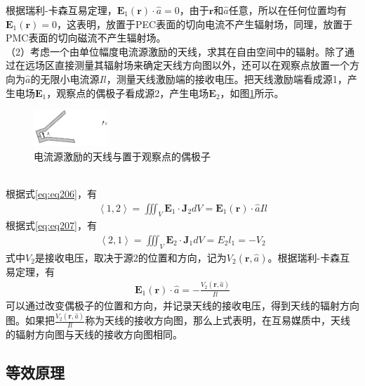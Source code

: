 \documentclass{article}
\numberwithin{equation}{section}
\renewcommand{\vec}[1]{\boldsymbol{#1}}
\begin{document}
根据瑞利-卡森互易定理，$\mathbf{E}_1(\vec{r})\cdot\hat{a}=0$，由于$\vec{r}$和$\hat{a}$任意，所以在任何位置均有$\mathbf{E}_1(\vec{r})=0$，这表明，放置于PEC表面的切向电流不产生辐射场，同理，放置于PMC表面的切向磁流不产生辐射场。\\
（2）考虑一个由单位幅度电流源激励的天线，求其在自由空间中的辐射。除了通过在远场区直接测量其辐射场来确定天线方向图以外，还可以在观察点放置一个方向为$\hat{a}$的无限小电流源$Il$，测量天线激励端的接收电压。把天线激励端看成源1，产生电场$\mathbf{E}_1$，观察点的偶极子看成源2，产生电场$\mathbf{E}_2$，如图\ref{fig:fig13}所示。
\begin{figure}[ht]
    \centering
    \includegraphics[width=0.25\textwidth]{电流源激励的天线与置于观察点的偶极子.PNG}
    \caption{电流源激励的天线与置于观察点的偶极子}
    \label{fig:fig13}
\end{figure}
\\根据式\ref{eq:eq206}，有
\begin{align}
    \label{eq:eq211}
    \left\langle 1,2\right\rangle =\iiint_V\mathbf{E}_1\cdot\mathbf{J}_2dV=\mathbf{E}_1(\vec{r})\cdot\hat{a}Il
\end{align}
根据式\ref{eq:eq207}，有
\begin{align}
    \label{eq:eq212}
    \left\langle 2,1\right\rangle =\iiint_V\mathbf{E}_2\cdot\mathbf{J}_1dV=E_2l_1=-V_2
\end{align}
式中$V_2$是接收电压，取决于源2的位置和方向，记为$V_2(\vec{r},\hat{a})$。根据瑞利-卡森互易定理，有
\begin{align}
    \label{eq:eq213}
    \mathbf{E}_1(\vec{r})\cdot\hat{a}=-\frac{V_2(\vec{r},\hat{a})}{Il}
\end{align}
可以通过改变偶极子的位置和方向，并记录天线的接收电压，得到天线的辐射方向图。如果把$\frac{V_2(\vec{r},\hat{a})}{Il}$称为天线的接收方向图，那么上式表明，在互易媒质中，天线的辐射方向图与天线的接收方向图相同。
\subsection{等效原理}
\end{document}
